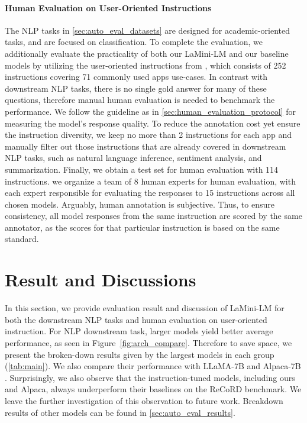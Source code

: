 \documentclass[11pt]{article}
\newcommand{\modelnamefull}{LaMini-LM\xspace}
\begin{document}
\paragraph{Human Evaluation on User-Oriented Instructions}

The NLP tasks in \autoref{sec:auto_eval_datasets} are designed for academic-oriented tasks, and are focused on classification.
To complete the evaluation, 
we additionally evaluate the practicality of both our \modelnamefull and our baseline models by utilizing the user-oriented instructions from \citet{DBLP:journals/corr/abs-2212-10560}, which consists of 252 instructions covering 71 commonly used apps use-cases. In contrast with downstream NLP tasks, there is no single gold answer for many of these questions, therefore manual human evaluation is needed to benchmark the performance. We follow the guideline as in \autoref{sec:human_evaluation_protocol} for measuring the model's response quality.
To reduce the annotation cost yet ensure the instruction diversity, we keep no more than 2 instructions for each app and manually filter out those instructions that are already covered in downstream NLP tasks, such as natural language inference, sentiment analysis, and summarization.
Finally, we obtain a test set for human evaluation with 114 instructions.
we organize a team of 8 human experts for human evaluation, with each expert responsible for evaluating the responses to 15 instructions across all chosen models. 
Arguably, human annotation is subjective. Thus, to ensure consistency, all model responses from the same instruction are scored by the same annotator, as the scores for that particular instruction is based on the same standard.





%
 \section{Result and Discussions}

In this section, we provide evaluation result and discussion of \modelnamefull for both the downstream NLP tasks and human evaluation on user-oriented instruction. For NLP downstream task, larger models yield better average performance, as seen in Figure~\ref{fig:arch_compare}. Therefore to save space, we present the broken-down results given by the largest models in each group (\autoref{tab:main}). We also compare their performance with LLaMA-7B \cite{touvron2023llama} and Alpaca-7B \cite{alpaca}. Surprisingly, we also observe that the instruction-tuned models, including ours and Alpaca, always underperform their baselines on the ReCoRD benchmark. We leave the further investigation of this observation to future work.
Breakdown results of other models can be found in \autoref{sec:auto_eval_results}.
\end{document}
